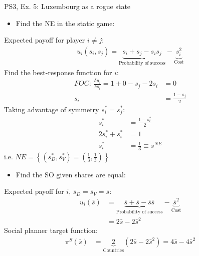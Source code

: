 \begin{frame}{PS3, Ex. 5: Luxembourg as a rogue state}
  \begin{multicols}{2}
    \begin{itemize}
      \item[(a)] Find the NE in the static game:
    \end{itemize}
    Expected payoff for player $i\neq j$:
    \begin{align*}
      u_i(s_i,s_j)=\underbrace{s_i+s_j-s_is_j}_\text{Probability of success}-\underbrace{s_i^2}_\text{Cost}
    \end{align*}
    Find the best-response function for $i$:
    \begin{align*}
      FOC:\ \frac{\delta u_i}{\delta s_i}=1+0-s_j-2s_i&=0\\
       s_i&=\frac{1-s_j}{2}
    \end{align*}
    Taking advantage of symmetry $s_i^{*}=s_j^{*}$:
    \begin{align*}
       s_i^{*}&=\frac{1-s_i^{*}}{2}\\
      2s_i^{*}+s_i^{*}&=1\\
       s_i^{*}&=\frac{1}{3}\equiv s^{NE}
    \end{align*}
    i.e. $NE=\left\{(s_D^{*},s_V^{*})=(\frac{1}{3},\frac{1}{3})\right\}$
  \vfill\null\columnbreak
    \begin{itemize}
      \item[(b)] Find the SO given shares are equal:
    \end{itemize}
    Expected payoff for $i$, $\bar{s}_D=\bar{s}_V=\bar{s}$:
    \begin{align*}
      u_i(\bar{s})&=\underbrace{\bar{s}+\bar{s}-\bar{s}\bar{s}}_\text{Probability of success}-\underbrace{\bar{s}^2}_\text{Cost}\\
                  &=2\bar{s}-2\bar{s}^2
    \end{align*}
    Social planner target function:
    \begin{align*}
      \pi^S(\bar{s})&=\underbrace{2}_\text{Countries}(2\bar{s}-2\bar{s}^2)=4\bar{s}-4\bar{s}^2
    \end{align*}
  \vfill\null
  \end{multicols}
\end{frame}
